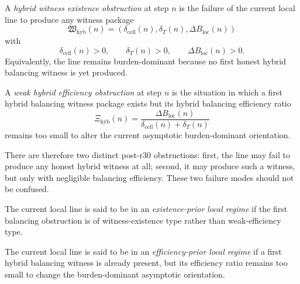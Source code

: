\begin{definition}
\label{def:hybrid-witness-existence-obstruction}
A \emph{hybrid witness existence obstruction} at step \(n\) is the failure of the current local line to produce any witness package
\[
  \mathfrak W_{\mathrm{hyb}}(n)
  =
  (\delta_{\mathrm{cell}}(n),\delta_T(n),\Delta B_{\mathrm{loc}}(n))
\]
with
\[
  \delta_{\mathrm{cell}}(n)>0,
  \qquad
  \delta_T(n)>0,
  \qquad
  \Delta B_{\mathrm{loc}}(n)>0.
\]
Equivalently, the line remains burden-dominant because no first honest hybrid balancing witness is yet produced.
\end{definition}

\begin{definition}
\label{def:weak-hybrid-efficiency-obstruction}
A \emph{weak hybrid efficiency obstruction} at step \(n\) is the situation in which a first hybrid balancing witness package exists but its hybrid balancing efficiency ratio
\[
  \Xi_{\mathrm{hyb}}(n)
  =
  \frac{\Delta B_{\mathrm{loc}}(n)}{\delta_{\mathrm{cell}}(n)+\delta_T(n)}
\]
remains too small to alter the current asymptotic burden-dominant orientation.
\end{definition}

\begin{remark}
\label{rem:existence-versus-efficiency}
There are therefore two distinct post-r30 obstructions:
first, the line may fail to produce any honest hybrid witness at all;
second, it may produce such a witness, but only with negligible balancing efficiency.
These two failure modes should not be confused.
\end{remark}

\begin{definition}
\label{def:existence-prior-local-regime}
The current local line is said to be in an \emph{existence-prior local regime} if the first balancing obstruction is of witness-existence type rather than weak-efficiency type.
\end{definition}

\begin{definition}
\label{def:efficiency-prior-local-regime}
The current local line is said to be in an \emph{efficiency-prior local regime} if a first hybrid balancing witness is already present, but its efficiency ratio remains too small to change the burden-dominant asymptotic orientation.
\end{definition}

